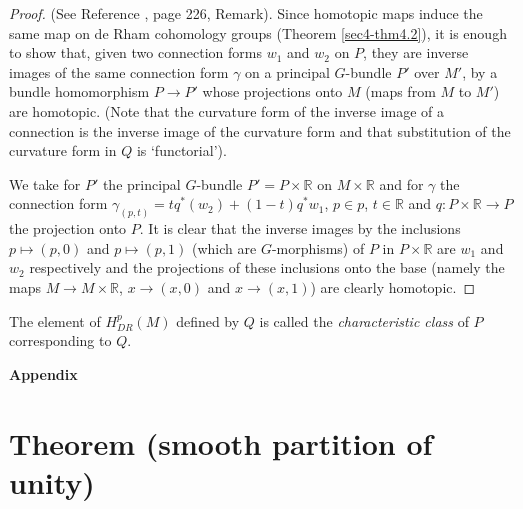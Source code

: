 \begin{proof}
(See Reference \cite{key3}, page 226, Remark).
Since homotopic maps induce the same map on de Rham cohomology groups (Theorem \ref{sec4-thm4.2}), it is enough to show that, given two connection forms $w_{1}$ and $w_{2}$ on $P$, they are inverse images of the same connection form $\gamma$ on a principal $G$-bundle $P'$ over $M'$, by a bundle homomorphism $P\to P'$ whose projections onto $M$ (maps from $M$ to $M'$) are homotopic. (Note that the curvature form of the inverse image of a connection is the inverse image of the curvature form and that substitution of the curvature form in $Q$ is `functorial').

We take for $P'$ the principal $G$-bundle $P'=P\times \mathbb{R}$ on $M\times \mathbb{R}$ and for $\gamma$ the connection form $\gamma_{(p,t)}=tq^{*}(w_{2})+(1-t)q^{*}w_{1}$, $p\in p$, $t\in \mathbb{R}$ and $q:P\times \mathbb{R}\to P$ the projection onto $P$. It is clear that the inverse images by the inclusions $p\mapsto (p,0)$ and $p\mapsto (p,1)$ (which are $G$-morphisms) of $P$ in $P\times \mathbb{R}$ are $w_{1}$ and $w_{2}$ respectively and the projections of these inclusions onto the base (namely the maps $M\to M\times \mathbb{R}$, $x\to (x,0)$ and $x\to (x,1)$) are clearly homotopic.
\end{proof}

\begin{remark}\label{sec13-rem13.2}
The element of $H^{p}_{DR}(M)$ defined by $Q$ is called the {\em characteristic class} of $P$ corresponding to $Q$.
\end{remark}

\vskip 1cm

\appendix

\begin{center}
{\huge\bfseries Appendix}
\end{center}

\setcounter{section}{0}
\section{Theorem (smooth partition of unity)}\label{sec13-app-sec1}

